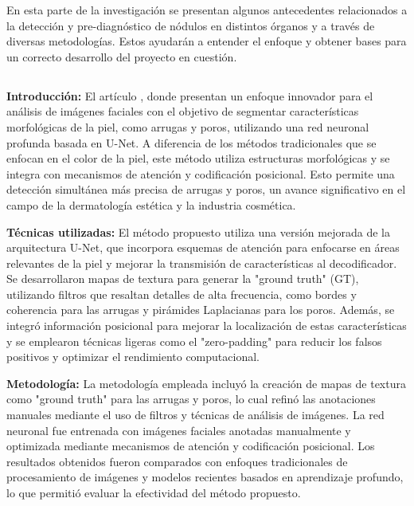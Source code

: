 En esta parte de la investigación se presentan algunos antecedentes relacionados a la detección y pre-diagnóstico de nódulos en distintos órganos y a través de diversas metodologías. Estos ayudarán a entender el enfoque y obtener bases para un correcto desarrollo del proyecto en cuestión.

\subsection{}

\textbf{Introducción:}
El artículo , donde \cite{yoon2023} presentan un enfoque innovador para el análisis de imágenes faciales con el objetivo de segmentar características morfológicas de la piel, como arrugas y poros, utilizando una red neuronal profunda basada en U-Net. A diferencia de los métodos tradicionales que se enfocan en el color de la piel, este método utiliza estructuras morfológicas y se integra con mecanismos de atención y codificación posicional. Esto permite una detección simultánea más precisa de arrugas y poros, un avance significativo en el campo de la dermatología estética y la industria cosmética.

\textbf{Técnicas utilizadas:}
El método propuesto utiliza una versión mejorada de la arquitectura U-Net, que incorpora esquemas de atención para enfocarse en áreas relevantes de la piel y mejorar la transmisión de características al decodificador. Se desarrollaron mapas de textura para generar la "ground truth" (GT), utilizando filtros que resaltan detalles de alta frecuencia, como bordes y coherencia para las arrugas y pirámides Laplacianas para los poros. Además, se integró información posicional para mejorar la localización de estas características y se emplearon técnicas ligeras como el "zero-padding" para reducir los falsos positivos y optimizar el rendimiento computacional.

\textbf{Metodología:}
La metodología empleada incluyó la creación de mapas de textura como "ground truth" para las arrugas y poros, lo cual refinó las anotaciones manuales mediante el uso de filtros y técnicas de análisis de imágenes. La red neuronal fue entrenada con imágenes faciales anotadas manualmente y optimizada mediante mecanismos de atención y codificación posicional. Los resultados obtenidos fueron comparados con enfoques tradicionales de procesamiento de imágenes y modelos recientes basados en aprendizaje profundo, lo que permitió evaluar la efectividad del método propuesto.

